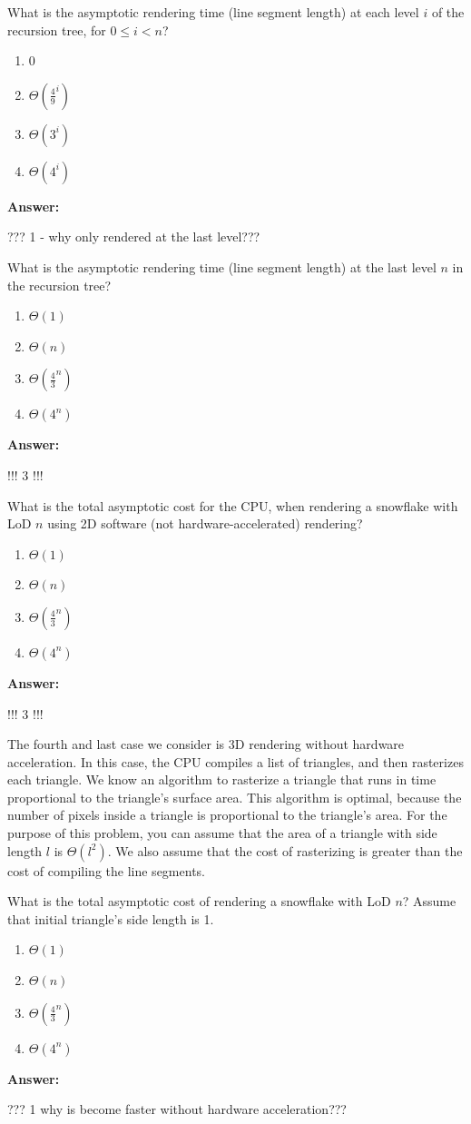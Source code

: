\documentclass[12pt,twoside]{article}
\newcommand{\answer}{
 \par\medskip
 \textbf{Answer:}
}
\newcommand{\answerIq}{ \answer
??? 1 - why only rendered at the last level??? 
}
\newcommand{\answerIr}{ \answer
!!! 3 !!!
}
\newcommand{\answerIs}{ \answer
!!! 3 !!!
}
\newcommand{\answerIt}{ \answer
??? 1 why is become faster without hardware acceleration???
}
\begin{document}
\begin{problems}
\begin{problemparts}
  \problempart {} What is the asymptotic rendering time (line segment length)
  at each level $i$ of the recursion tree, for $0 \le i < n$?
    \begin{enumerate}
      \item 0
      \item $\Theta(\frac{4}{9} ^ i)$
      \item $\Theta(3 ^ i)$
      \item $\Theta(4 ^ i)$
    \end{enumerate}
\answerIq

  \problempart {} What is the asymptotic rendering time (line segment length)
  at the last level $n$ in the recursion tree?
    \begin{enumerate}
      \item $\Theta(1)$
      \item $\Theta(n)$
      \item $\Theta(\frac{4}{3}^n)$
      \item $\Theta(4^n)$
    \end{enumerate}
\answerIr

  \problempart {} What is the total asymptotic cost for the CPU, when rendering
  a snowflake with LoD $n$ using 2D software (not hardware-accelerated)
  rendering?
   \begin{enumerate}
      \item $\Theta(1)$
      \item $\Theta(n)$
      \item $\Theta(\frac{4}{3}^n)$
      \item $\Theta(4^n)$
    \end{enumerate}
\answerIs

\end{problemparts}

The fourth and last case we consider is 3D rendering without hardware
acceleration. In this case, the CPU compiles a list of triangles, and then
rasterizes each triangle. We know an algorithm to rasterize a triangle that
runs in time proportional to the triangle's surface area. This algorithm is
optimal, because the number of pixels inside a triangle is proportional to the
triangle's area. For the purpose of this problem, you can assume that the area
of a triangle with side length $l$ is $\Theta(l^2)$. We also assume that the
cost of rasterizing is greater than the cost of compiling the line segments.

\begin{problemparts}
  \problempart {} What is the total asymptotic cost of rendering a snowflake
  with LoD $n$? Assume that initial triangle's side length is 1.
    \begin{enumerate}
      \item $\Theta(1)$
      \item $\Theta(n)$
      \item $\Theta(\frac{4}{3}^n)$
      \item $\Theta(4^n)$
    \end{enumerate}
\answerIt
    

\end{problemparts}
\end{problems}
\end{document}
